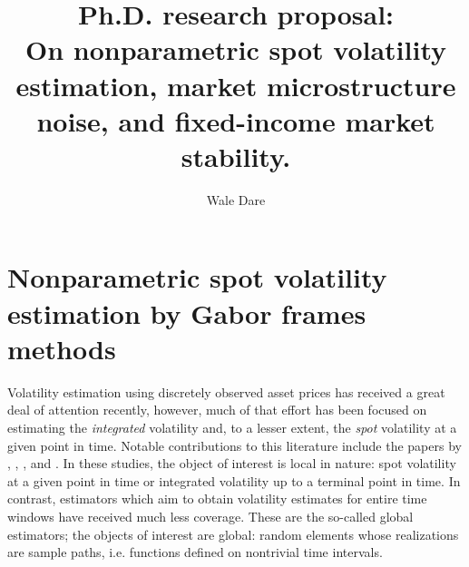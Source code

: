 
\usepackage[toc,page]{appendix}
\renewcommand{\i}{\mathrm{i}} 
\newcommand{\sumn}{\ensuremath{\sum_{k \in \nats}}\xspace}
\newcommand{\sumi}{\ensuremath{\sum_{k \in \ints}}\xspace}
\newcommand{\sumt}{\ensuremath{\sum_{(h,k) \in \Theta_n}}\xspace}
\newcommand{\sv}{\ensuremath{\sigma_t^2}\xspace}
\newcommand{\bsv}{\ensuremath{\bar{\sigma}^2}\xspace}
\newcommand{\svnt}{\ensuremath{\sigma^2}\xspace}
\newcommand{\svhk}{\ensuremath{\sigma^2_{h,k}}\xspace}
\newcommand{\vh}{\ensuremath{V_h(\phi)}\xspace}
\newcommand{\idp}{\ensuremath{\mu}\xspace}
\newcommand{\svn}{\ensuremath{\hat{\sigma}_{n}^2}\xspace}
\newcommand{\Svn}{\ensuremath{\hat{\Sigma}_n}\xspace}
\newcommand{\svnb}{\ensuremath{\hat{\sigma}_{n,b}^2}\xspace}
\newcommand{\svnN}{\ensuremath{\hat{\sigma}_{t}^2}\xspace}
\newcommand{\hs}{\ensuremath{\mcal{H}}\xspace}
\newcommand{\T}{\ensuremath{\tau}\xspace}
\newcommand{\chk}{\ensuremath{{c}_{h,k}}\xspace}
\newcommand{\cnhk}{\ensuremath{\hat{c}_{h,k}}\xspace}
\newcommand{\ivp}{\ensuremath{\sigma}\xspace}
\newcommand{\inner}[2]{\ensuremath{\langle{#1},{#2}\rangle}\xspace}
\newcommand{\ghk}{\ensuremath{g_{h,k}}\xspace}
\newcommand{\tghk}{\ensuremath{\tilde{g}_{h,k}}\xspace}
\newcommand{\btghki}{\ensuremath{\overline{\tilde{g}_{h,k}(t_i)}}\xspace}
\newcommand{\btghks}{\ensuremath{\overline{\tilde{g}_{h,k}(s)}}\xspace}
\newcommand{\tg}{\ensuremath{\tilde{g}}\xspace}
\newcommand{\hkints}{\ensuremath{h,k \in \ints}\xspace}
\title{Ph.D. research proposal: \\ On nonparametric spot  volatility estimation, market microstructure noise, and fixed-income market stability.}
\author{Wale Dare}

\maketitle
\tableofcontents
\chapter {Nonparametric spot volatility estimation by Gabor frames methods}
Volatility estimation using discretely observed asset prices has received a great deal of attention recently, however,  much of that effort has been focused on 
estimating the \emph{integrated} volatility and, to a lesser extent, the \emph{spot} volatility at a given point in time. 
Notable contributions to this literature include  the papers by \cite{Foster1996}, \cite{Fan2008},   \cite{Florens1993}, and  \cite{BN2004}.
In these studies, the object of interest is local in nature: spot volatility at a given point in time or integrated volatility up to a terminal point in time. In contrast,  estimators which aim  to obtain  volatility estimates  for  entire time windows  have received much less coverage. These are the so-called global estimators; the objects of interest are global:   random elements whose realizations are sample paths, i.e. functions defined on  nontrivial time intervals.     


